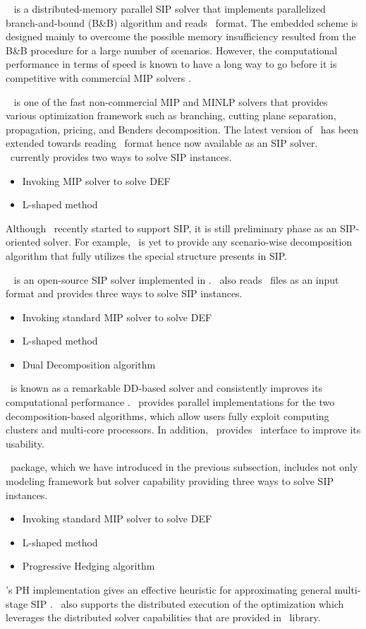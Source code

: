 \pipssbb\ \cite{web:PIPS-SBB} is a distributed-memory parallel SIP solver that implements parallelized branch-and-bound (B\&B) algorithm and reads \smps\ format. The embedded scheme is designed mainly to overcome the possible memory insufficiency resulted from the B\&B procedure for a large number of scenarios. However, the computational performance in terms of speed is known to have a long way to go before it is competitive with commercial MIP solvers \cite{proceeding:MOR2016}.

\scip\ \cite{SCIP} is one of the fast non-commercial MIP and MINLP solvers that provides various optimization framework such as branching, cutting plane separation, propagation, pricing, and Benders decomposition. The latest version of \scip\ has been extended towards reading \smps\ format hence now available as an SIP solver. \scip\ currently provides two ways to solve SIP instances.
\begin{itemize}
	\item Invoking MIP solver to solve DEF
	\item L-shaped method
\end{itemize}
Although \scip\ recently started to support SIP, it is still preliminary phase as an SIP-oriented solver. For example, \scip\ is yet to provide any scenario-wise decomposition algorithm that fully utilizes the special structure presents in SIP.

\dsp\ \cite{web:DSP} is an open-source SIP solver implemented in \cpp. \dsp\ also reads \smps\ files as an input format and provides three ways to solve SIP instances.
\begin{itemize}
	\item Invoking standard MIP solver to solve DEF
	\item L-shaped method
	\item Dual Decomposition algorithm
\end{itemize}
\dsp\ is known as a remarkable DD-based solver and consistently improves its computational performance \cite{journal:KZ2015}. \dsp\ provides parallel implementations for the two decomposition-based algorithms, which allow users fully exploit computing clusters and multi-core processors. In addition, \dsp\ provides \julia\ interface to improve its usability.

\pysp\ package, which we have introduced in the previous subsection, includes not only modeling framework but solver capability providing three ways to solve SIP instances. 
\begin{itemize}
	\item Invoking standard MIP solver to solve DEF
	\item L-shaped method
	\item Progressive Hedging algorithm
\end{itemize}
\pysp's PH implementation gives an effective heuristic for approximating general multi-stage SIP \cite{journal:WWH2012}. \pysp\ also supports the distributed execution of the optimization which leverages the distributed solver capabilities that are provided in \pyomo\ library.

